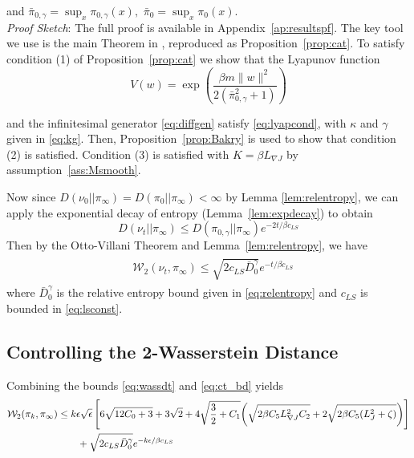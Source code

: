 \documentclass[journal,onecolumn]{IEEEtran}
\newcommand{\step}{\epsilon}
\newcommand{\grad}{\nabla}
\newcommand{\rew}{J}
\newcommand{\wass}{\mathcal{W}_2}
\newcommand{\KL}{D}
\newcommand{\gibbs}{\ids_{\infty}}
\newcommand{\idistr}{\ids_0}
\newcommand{\dtlaw}{\ids_{k}} %
\newcommand{\ctlawt}{\nu_t}
\newcommand{\LSconst}{c_{LS}}
\newcommand{\ids}{\pi}
\newcommand{\idistmax}{\bar{\ids}_0}
\newcommand{\idw}{\gamma}
\newcommand{\isp}{0,\idw}
\newcommand{\ksp}{k,\idw}
\newcommand{\idistmaxw}{\bar{\ids}_{\isp}}
\newcommand{\relentbd}{\bar{\KL}_0}
\newcommand{\relentbdw}{\relentbd^{\idw}}
\newcommand{\dissm}{m}
\newcommand{\gradnvar}{\zeta}
\newcommand{\idistrw}{\ids_{\isp}}
\newcommand{\lipJ}{L_J}
\newcommand{\lipGJ}{L_{\grad\rew}}
\begin{document}
{\begin{align}
\begin{split}
    \end{split}
\end{align}
and $\idistmaxw = \sup_{x}\idistrw(x), \, \, \idistmax = \sup_{x}\idistr(x)$.\\
\textit{Proof Sketch}:
The full proof is available in Appendix~\ref{ap:resultspf}. The key tool we use is the main Theorem in \cite{cattiaux2008note}, reproduced as Proposition~\ref{prop:cat}. To satisfy condition (1) of Proposition~\ref{prop:cat} we show that the Lyapunov function \[V(w) = \exp\left(\frac{\beta \dissm\|w\|^2 }{2(\idistmaxw^2 +1)}\right)\]

and the infinitesimal generator \eqref{eq:diffgen} satisfy \eqref{eq:lyapcond}, with $\kappa$ and $\gamma$ given in \eqref{eq:kg}. Then, Proposition~\ref{prop:Bakry} is used to show that condition (2) is satisfied. Condition (3) is satisfied with $K = \beta \lipGJ$ by assumption~\ref{ass:Msmooth}. 

Now since $\KL (\nu_0|| \gibbs) = \KL (\idistr || \gibbs) < \infty$ by Lemma \ref{lem:relentropy}, we can apply the exponential decay of entropy (Lemma~\ref{lem:expdecay}) to obtain
\begin{equation}
\label{eq:CTbound}
\KL (\ctlawt|| \gibbs) \leq \KL(\idistrw || \gibbs)e^{-2t/\beta \LSconst} 
\end{equation}
Then by the Otto-Villani Theorem and Lemma~\ref{lem:relentropy}, we have 
\begin{align}
\begin{split}
\label{eq:ct_bd}
&\wass(\ctlawt,\gibbs) \leq \sqrt{2\LSconst \relentbdw} e^{-t/\beta \LSconst} 
\end{split}
\end{align}
where $\relentbdw$ is the relative entropy bound given in \eqref{eq:relentropy} and $\LSconst$ is bounded in \eqref{eq:lsconst}. 


\subsection{Controlling the 2-Wasserstein Distance}
Combining the bounds \eqref{eq:wassdt} and \eqref{eq:ct_bd} yields
\begin{gather}
\begin{aligned}
\begin{split}
\label{eq:wasstotal}
    \wass(\dtlaw,\gibbs) &\leq k\step\sqrt{\step}\left[6\sqrt{12C_0 + 3} + 3\sqrt{2} + 4\sqrt{\frac{3}{2} + C_1 }{\color{black}\left(\sqrt{2\beta C_5 \lipGJ^2 C_2} + 2\sqrt{2\beta C_5(\lipJ^2 + \gradnvar)} \right)}\right] \\
    &\quad \quad + \sqrt{2\LSconst \relentbdw} e^{-{k\step}/\beta \LSconst}
\end{split}
\end{aligned}\raisetag{-3\baselineskip}
\end{gather}

}
\end{document}

